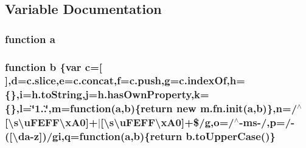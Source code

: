 \subsection{Variable Documentation}
\hypertarget{static_2root_2js_2jquery-1_811_81_8min_8js_aa4d4888597588a84fd5b1184d00c91f3}{
\subsubsection[{a}]{\setlength{\rightskip}{0pt plus 5cm}function a}}\label{static_2root_2js_2jquery-1_811_81_8min_8js_aa4d4888597588a84fd5b1184d00c91f3}
\hypertarget{static_2root_2js_2jquery-1_811_81_8min_8js_ac0431efac4d7c393d1e70b86115cb93f}{
\subsubsection[{b}]{\setlength{\rightskip}{0pt plus 5cm}function b \{var {\bf c}=\mbox{[}$\,$\mbox{]},{\bf d}=c.\-slice,{\bf e}=c.\-concat,{\bf f}=c.\-push,{\bf g}=c.\-index\-Of,{\bf h}=\{\},{\bf i}=h.\-to\-String,{\bf j}=h.\-has\-Own\-Property,{\bf k}=\{\},{\bf l}=\char`\"{}1..\char`\"{},{\bf m}=function({\bf a},b)\{return new {\bf m.\-fn.\-init}({\bf a},b)\},{\bf n}=/$^\wedge$\mbox{[}\textbackslash{}s\textbackslash{}u\-F\-E\-F\-F\textbackslash{}x\-A0\mbox{]}+$\vert$\mbox{[}\textbackslash{}s\textbackslash{}u\-F\-E\-F\-F\textbackslash{}x\-A0\mbox{]}+\$/{\bf g},{\bf o}=/$^\wedge$-\/ms-\//,{\bf p}=/-\/(\mbox{[}\textbackslash{}da-\/z\mbox{]})/gi,q=function({\bf a},b)\{return b.\-to\-Upper\-Case()\}}}\label{static_2root_2js_2jquery-1_811_81_8min_8js_ac0431efac4d7c393d1e70b86115cb93f}
